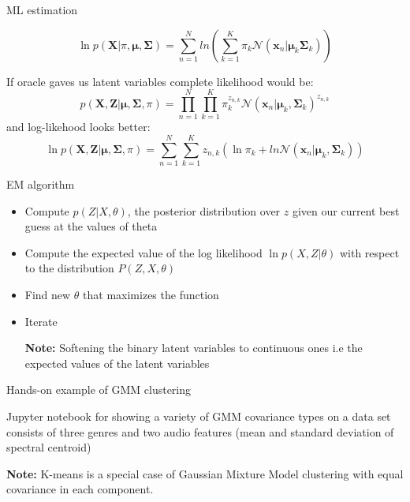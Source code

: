 \documentclass[12pt]{beamer}
\begin{document}
\begin{frame}{ML estimation} 

\[
\ln p(\boldsymbol X | \pi, \boldsymbol \mu, \boldsymbol \Sigma) = \sum_{n=1}^{N}  ln \left (  \sum_{k=1}^{K} \pi_k \mathcal{N}(\boldsymbol x_n | \boldsymbol \mu_k \boldsymbol \Sigma_k)  
\right ) 
\]

If oracle gaves us latent variables complete likelihood would be: 
\[
p(\boldsymbol X, \boldsymbol Z | \boldsymbol \mu, \boldsymbol \Sigma, \pi) = 
\prod_{n=1}^{N}\prod_{k=1}^{K} \pi_k^{z_{n,k}} \mathcal{N}(\boldsymbol x_n | \boldsymbol \mu_k, \boldsymbol \Sigma_k) ^{z_{n,k}} 
\]
and log-likehood looks better: 
\[
\ln p(\boldsymbol X, \boldsymbol Z | \boldsymbol \mu, \boldsymbol \Sigma, \pi) =  \sum_{n=1}^{N}\sum_{k=1}^{K} z_{n,k} \left ( \ln \pi_k + ln \mathcal{N}(\boldsymbol x_n | \boldsymbol \mu_k, \boldsymbol \Sigma_k) \right ) 
\]
\end{frame} 


\begin{frame}{EM algorithm} 

\begin{itemize} 
\item Compute $p(Z|X,\theta)$, the posterior distribution over 
$z$ given our current best guess at the values of theta 
\item Compute the expected value of the log likelihood 
$\ln p(X,Z| \theta)$ with respect to the distribution 
$P(Z,X, \theta)$ 
\item Find new $\theta$ that maximizes the function 
\item Iterate 

{\bf Note:} Softening the binary latent variables to continuous ones 
i.e the expected values of the latent variables 

\end{itemize}

\end{frame} 

\begin{frame}{Hands-on example of GMM clustering} 

  Jupyter notebook for showing a variety of GMM covariance types on
  a data set consists of three genres and two audio features
  (mean and standard deviation of spectral centroid) 
  

{\bf Note:} K-means is a special case of Gaussian Mixture Model 
clustering with equal covariance in each component. 

\end{frame} 
\end{document}
